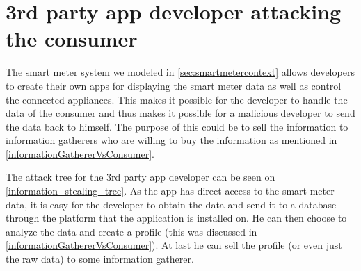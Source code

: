 \section{3rd party app developer attacking the consumer}\label{3rdpartyattacktree}
The smart meter system we modeled in \cref{sec:smartmetercontext} allows developers to create their own apps for displaying the smart meter data as well as control the connected appliances.
This makes it possible for the developer to handle the data of the consumer and thus makes it possible for a malicious developer to send the data back to himself.
The purpose of this could be to sell the information to information gatherers who are willing to buy the information as mentioned in \cref{informationGathererVsConsumer}.

The attack tree for the 3rd party app developer can be seen on \cref{information_stealing_tree}.
As the app has direct access to the smart meter data, it is easy for the developer to obtain the data and send it to a database through the platform that the application is installed on.
He can then choose to analyze the data and create a profile (this was discussed in \cref{informationGathererVsConsumer}).
At last he can sell the profile (or even just the raw data) to some information gatherer.


